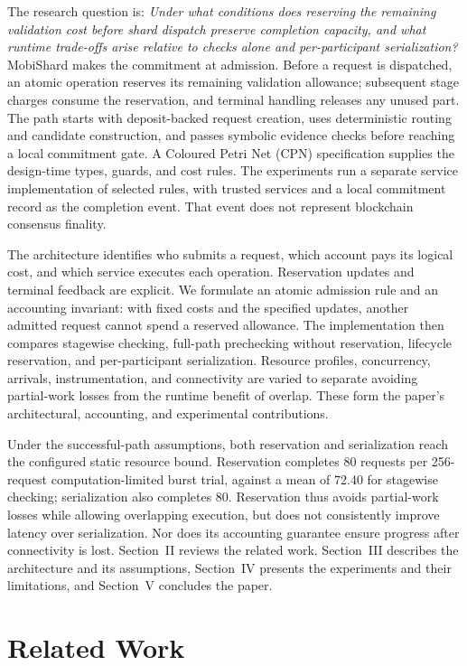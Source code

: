 The research question is: \emph{Under what conditions does reserving the remaining
validation cost before shard dispatch preserve completion capacity, and what
runtime trade-offs arise relative to checks alone and per-participant
serialization?} MobiShard makes the commitment at admission. Before a request
is dispatched, an atomic operation reserves its remaining validation allowance;
subsequent stage charges consume the reservation, and terminal handling
releases any unused part. The path starts with deposit-backed request creation,
uses deterministic routing and candidate construction, and passes symbolic
evidence checks before reaching a local commitment gate. A Coloured Petri Net
(CPN) specification supplies the design-time types, guards, and cost rules.
The experiments run a separate service implementation of selected rules,
with trusted services and a local commitment record as the completion event.
That event does not represent blockchain consensus finality.

The architecture identifies who submits a request, which account pays its
logical cost, and which service executes each operation. Reservation updates
and terminal feedback are explicit. We formulate an atomic admission rule
and an accounting invariant: with fixed costs and the specified updates,
another admitted request cannot spend a reserved allowance. The implementation
then compares stagewise checking, full-path prechecking without reservation,
lifecycle reservation, and per-participant serialization. Resource profiles,
concurrency, arrivals, instrumentation, and connectivity are varied to separate
avoiding partial-work losses from the runtime benefit of overlap. These form
the paper's architectural, accounting, and experimental contributions.

Under the successful-path assumptions, both reservation and serialization
reach the configured static resource bound. Reservation completes 80 requests
per 256-request computation-limited burst trial, against a mean of 72.40 for
stagewise checking; serialization also completes 80. Reservation thus avoids
partial-work losses while allowing overlapping execution, but does not
consistently improve latency over serialization. Nor does its accounting
guarantee ensure progress after connectivity is lost. Section~II reviews the
related work. Section~III describes the architecture and its assumptions,
Section~IV presents the experiments and their limitations, and Section~V
concludes the paper.

\section{Related Work}
\label{sec:related-work}

